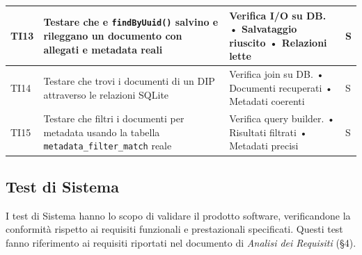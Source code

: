 \documentclass[a4paper,12pt]{article}
\begin{document}
\begin{longtable}{|M{1.2cm}|M{6.3cm}|M{5cm}|M{1.5cm}|}
            TI13 & Testare che \texttt{} e \texttt{findByUuid()} salvino e rileggano un documento con allegati e metadata reali & Verifica I/O su DB. \newline • Salvataggio riuscito \newline • Relazioni lette & S \\ \hline
            
            TI14 & Testare che \texttt{} trovi i documenti di un DIP attraverso le relazioni SQLite & Verifica join su DB. \newline • Documenti recuperati \newline • Metadati coerenti & S \\ \hline
            
            TI15 & Testare che \texttt{} filtri i documenti per metadata usando la tabella \texttt{metadata\_filter\_match} reale & Verifica query builder. \newline • Risultati filtrati \newline • Metadati precisi & S \\ 
            \hline

        \end{longtable}


        \subsection{Test di Sistema}

        I test di Sistema hanno lo scopo di validare il prodotto software, verificandone la conformità rispetto ai requisiti funzionali e prestazionali specificati.
        Questi test fanno riferimento ai requisiti riportati nel documento di \textit{Analisi dei Requisiti} (\S4).
\end{document}
